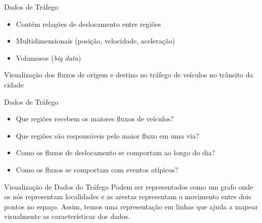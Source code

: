 
\begin{frame}{Dados de Tráfego}
  \begin{itemize}
    \item Contém relações de deslocamento entre regiões
    \item Multidimensionais (posição, velocidade, aceleração)
    \item Volumosos (\emph{big data})
  \end{itemize}
\end{frame}


\begin{frame}[standout]
  Visualização dos fluxos de origem e destino no tráfego de veículos no
trânsito da cidade
\end{frame}

\begin{frame}{Dados de Tráfego}
  \begin{itemize}
    \item Que regiões recebem os maiores fluxos de veículos?
    \item Que regiões são responsáveis pelo maior fluxo em uma via?
    \item Como os fluxos de deslocamento se comportam ao longo do dia?
    \item Como os fluxos se comportam com eventos atípicos?
  \end{itemize}
\end{frame}

\begin{frame}{Visualização de Dados do Tráfego}
  Podem ser representados como um grafo onde os nós representam localidades e
as arestas representam o movimento entre dois pontos no espaço. Assim, temos
uma representação em linhas que ajuda a mapear visualmente as características
dos dados.
\end{frame}

